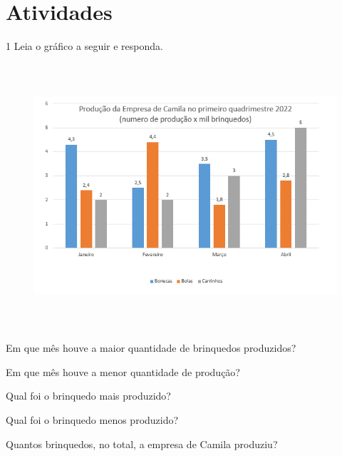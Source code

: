\section*{Atividades}

\num{1} Leia o gráfico a seguir e responda.

\begin{figure}[H]
\centering\includegraphics[width=5.90625in,height=3.86458in]{./imgSAEB_8_MAT/media/image39.png}
\end{figure}

\begin{escolha}[itemsep=0pt]
\item Em que mês houve a maior quantidade de brinquedos produzidos?\\

\item Em que mês houve a menor quantidade de produção?\\

\item Qual foi o brinquedo mais produzido?\\

\item Qual foi o brinquedo menos produzido?\\

\item Quantos brinquedos, no total, a empresa de Camila produziu?\\

\end{escolha}

